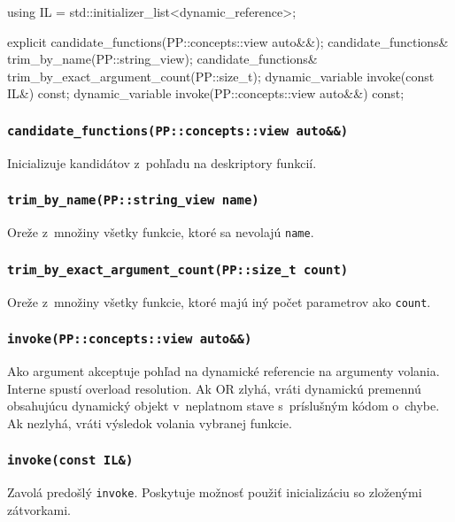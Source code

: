 \begin{code}[fontsize=\footnotesize]
using IL = std::initializer_list<dynamic_reference>;

explicit candidate_functions(PP::concepts::view auto&&);
candidate_functions& trim_by_name(PP::string_view);
candidate_functions& trim_by_exact_argument_count(PP::size_t);
dynamic_variable invoke(const IL&) const;
dynamic_variable invoke(PP::concepts::view auto&&) const;
\end{code}

\subsubsection{\texttt{candidate\_functions(PP::concepts::view auto\&\&)}}

Inicializuje kandidátov z~pohľadu na deskriptory funkcií.

\subsubsection{\texttt{trim\_by\_name(PP::string\_view name)}}

Oreže z~množiny všetky funkcie, ktoré sa nevolajú \texttt{name}.

\subsubsection{\texttt{trim\_by\_exact\_argument\_count(PP::size\_t count)}}

Oreže z~množiny všetky funkcie, ktoré majú iný počet parametrov ako \texttt{count}.

\subsubsection{\texttt{invoke(PP::concepts::view auto\&\&)}}

Ako argument akceptuje pohľad na dynamické referencie na argumenty volania. Interne spustí overload resolution. Ak OR zlyhá, vráti dynamickú premennú obsahujúcu dynamický objekt v~neplatnom stave s~príslušným kódom o~chybe. Ak nezlyhá, vráti výsledok volania vybranej funkcie.

\subsubsection{\texttt{invoke(const IL\&)}}

Zavolá predošlý \texttt{invoke}. Poskytuje možnosť použiť inicializáciu so zloženými zátvorkami.

